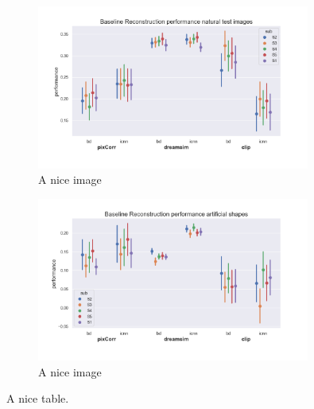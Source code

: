 \begin{figure}[ht]
    \centering
    \includegraphics[width=0.8\textwidth]{plots/baseline_reconstruction_test.png}
    \caption{A nice image}\label{fig:baselinerecontestquant}
\end{figure}

\begin{figure}[ht]
    \centering
    \includegraphics[width=0.8\textwidth]{plots/baseline_reconstruction_art.png}
    \caption{A nice image}\label{fig:baselinereconartquan}
\end{figure}

\begin{table}[ht]
    \centering

\caption{A nice table.}\label{tab:baseline_reconstruction}
\end{table}

